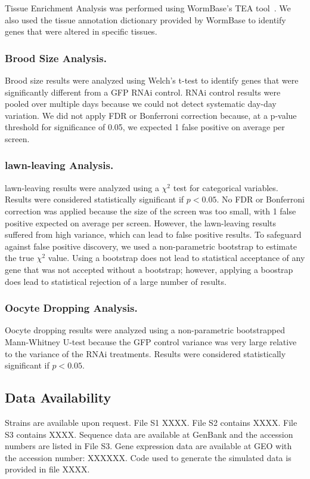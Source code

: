 \documentclass[9pt,twocolumn,twoside]{gsag3jnl}
\begin{document}
Tissue Enrichment Analysis was performed using WormBase's TEA tool~\citep{}. We also used the tissue annotation dictionary provided by WormBase to identify genes that were altered in specific tissues.
\subsubsection{Brood Size Analysis.}

Brood size results were analyzed using Welch's t-test to identify genes that were significantly different from a GFP RNAi control. RNAi control results were pooled over multiple days because we could not detect systematic day-day variation. We did not apply FDR or Bonferroni correction because, at a p-value threshold for significance of 0.05, we expected 1 false positive on average per screen.
\subsubsection{lawn-leaving Analysis.}

lawn-leaving results were analyzed using a $\chi^2$ test for categorical variables. Results were considered statistically significant if $p<0.05$. No FDR or Bonferroni correction was applied because the size of the screen was too small, with 1 false positive expected on average per screen. However, the lawn-leaving results suffered from high variance, which can lead to false positive results.
To safeguard against false positive discovery, we used a non-parametric bootstrap to estimate the true $\chi^2$ value. Using a bootstrap does not lead to statistical acceptance of any gene that was not accepted without a bootstrap; however, applying a boostrap does lead to statistical rejection of a large number of results.
\subsubsection{Oocyte Dropping Analysis.}

Oocyte dropping results were analyzed using a non-parametric bootstrapped Mann-Whitney U-test because the GFP control variance was very large relative to the variance of the RNAi treatments. Results were considered statistically significant if $p<0.05$.



\subsection{Data Availability}
\label{sb:data_availability}
Strains are available upon request. File S1 XXXX. File S2 contains XXXX. File S3 contains XXXX. Sequence data are available at GenBank and the accession numbers are listed in File S3. Gene expression data are available at GEO with the accession number: XXXXXX. Code used to generate the simulated data is provided in file XXXX.
\end{document}
